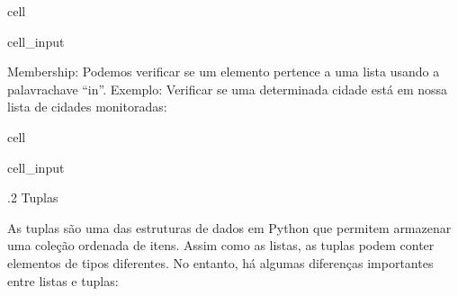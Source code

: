\documentclass[letterpaper,10pt,english]{jupyterBook}
\begin{document}
\begin{sphinxuseclass}{cell}\begin{sphinxVerbatimInput}

\begin{sphinxuseclass}{cell_input}
\begin{sphinxVerbatim}[commandchars=\\\{\}]
  \PYG{p}{[}\PYG{p}{]}  
\end{sphinxVerbatim}

\end{sphinxuseclass}\end{sphinxVerbatimInput}

\end{sphinxuseclass}
\sphinxAtStartPar
Membership: Podemos verificar se um elemento pertence a uma lista usando a palavra\sphinxhyphen{}chave “in”. Exemplo: Verificar se uma determinada cidade está em nossa lista de cidades monitoradas:

\begin{sphinxuseclass}{cell}\begin{sphinxVerbatimInput}

\begin{sphinxuseclass}{cell_input}
\begin{sphinxVerbatim}[commandchars=\\\{\}]
    
  
\end{sphinxVerbatim}

\end{sphinxuseclass}\end{sphinxVerbatimInput}

\end{sphinxuseclass}
.2 Tuplas

\sphinxAtStartPar
As tuplas são uma das estruturas de dados em Python que permitem armazenar uma coleção ordenada de itens. Assim como as listas, as tuplas podem conter elementos de tipos diferentes. No entanto, há algumas diferenças importantes entre listas e tuplas:
\end{document}
